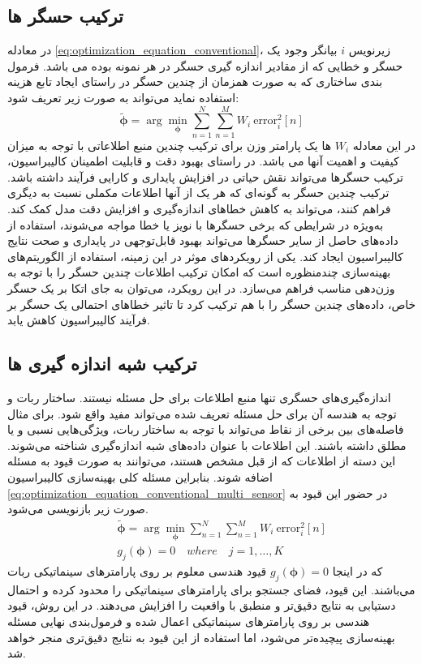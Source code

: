 \subsection{ترکیب حسگر ها}
در معادله 
\ref{eq:optimization_equation_conventional}،
زیرنویس 
$i$
بیانگر وجود یک حسگر و خطایی که از مقادیر اندازه گیری حسگر در هر نمونه بوده می باشد. فرمول بندی ساختاری که به صورت همزمان از چندین حسگر در راستای ایجاد تابع هزینه استفاده نماید می‌تواند به صورت زیر تعریف شود:
\begin{equation}\label{eq:optimization_equation_conventional_multi_sensor}
	\tilde{\boldsymbol{\phi}} =  \arg\min_{\boldsymbol{\phi}} \sum_{n = 1 }^{N} \sum_{n = 1 }^{M} W_i~\text{error}^2_i[n] 
\end{equation}
در این معادله 
$W_i$
ها یک پارامتر وزن برای ترکیب چندین منبع اطلاعاتی با توجه به میزان کیفیت و اهمیت آنها می باشد. در راستای بهبود دقت و قابلیت اطمینان کالیبراسیون، ترکیب حسگرها می‌تواند نقش حیاتی در افزایش پایداری و کارایی فرآیند داشته باشد. ترکیب چندین حسگر به گونه‌ای که هر یک از آنها اطلاعات مکملی نسبت به دیگری فراهم کنند، می‌تواند به کاهش خطاهای اندازه‌گیری و افزایش دقت مدل کمک کند. به‌ویژه در شرایطی که برخی حسگرها با نویز یا خطا مواجه می‌شوند، استفاده از داده‌های حاصل از سایر حسگرها می‌تواند بهبود قابل‌توجهی در پایداری و صحت نتایج کالیبراسیون ایجاد کند. یکی از رویکردهای موثر در این زمینه، استفاده از الگوریتم‌های بهینه‌سازی چندمنظوره است که امکان ترکیب اطلاعات چندین حسگر را با توجه به وزن‌دهی مناسب فراهم می‌سازد. در این رویکرد، می‌توان به جای اتکا بر یک حسگر خاص، داده‌های چندین حسگر را با هم ترکیب کرد تا تاثیر خطاهای احتمالی یک حسگر بر فرآیند کالیبراسیون کاهش یابد.

\subsection{ترکیب شبه اندازه گیری ها}
اندازه‌گیری‌های حسگری تنها منبع اطلاعات برای حل مسئله نیستند. ساختار ربات و توجه به هندسه آن برای حل مسئله تعریف شده می‌تواند مفید واقع شود. برای مثال فاصله‌های بین برخی از نقاط می‌تواند با توجه به ساختار ربات، ویژگی‌هایی نسبی و یا مطلق داشته باشند. این اطلاعات با عنوان داده‌های شبه اندازه‌گیری شناخته می‌شوند. این دسته از اطلاعات که از قبل مشخص هستند، می‌توانند به صورت قیود به مسئله اضافه شوند. بنابراین مسئله کلی بهینه‌سازی کالیبراسیون
\ref{eq:optimization_equation_conventional_multi_sensor}
در حضور این قیود به صورت زیر باز‌نویسی می‌شود. 
\begin{equation}
	\begin{aligned} \label{eq:optimization_equation_conventional_multi_sensor_measurement}
		&\tilde{\boldsymbol{\phi}} =  \arg\min_{\boldsymbol{\phi}} \sum_{n = 1 }^{N} \sum_{n = 1 }^{M} W_i~\text{error}^2_i[n] \\
		\quad &g_j(\boldsymbol{\phi}) = 0 \quad where \quad j = 1, \ldots, K
	\end{aligned}
\end{equation}
که در اینجا
$g_j(\boldsymbol{\phi}) = 0$ 
قیود هندسی معلوم بر روی پارامترهای سینماتیکی ربات می‌باشند. این قیود، فضای جستجو برای پارامترهای سینماتیکی را محدود کرده و احتمال دستیابی به نتایج دقیق‌تر و منطبق با واقعیت را افزایش می‌دهند. در این روش، قیود هندسی بر روی پارامترهای سینماتیکی اعمال شده و فرمول‌بندی نهایی مسئله بهینه‌سازی پیچیده‌تر می‌شود، اما استفاده از این قیود به نتایج دقیق‌تری منجر خواهد شد.

